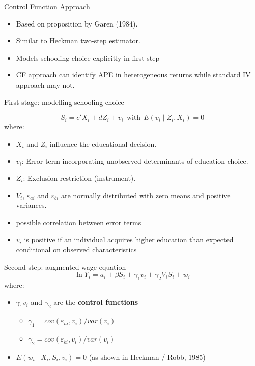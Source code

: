 \documentclass[10pt,ignorenonframetext,]{beamer}
\providecommand{\tightlist}{%
  \setlength{\itemsep}{0pt}\setlength{\parskip}{0pt}}
\begin{document}
\begin{frame}[allowframebreaks]{Control Function Approach}
\protect\hypertarget{control-function-approach}{}

\begin{itemize}
\tightlist
\item
  Based on proposition by Garen (1984).
\item
  Similar to Heckman two-step estimator.
\item
  Models schooling choice explicitly in first step
\item
  CF approach can identify APE in heterogeneous returns while standard
  IV approach may not.
\end{itemize}

First stage: modelling schooling choice

\[S_i = c'X_i + dZ_i + v_i ~~\text{with}~~ E(v_i \mid Z_i, X_i) = 0\]
where:

\begin{itemize}
\item
  \(X_i\) and \(Z_i\) influence the educational decision.
\item
  \(v_i\): Error term incorporating unobserved determinants of education
  choice.
\item
  \(Z_i\): Exclusion restriction (instrument).
\item
  \(V_i\), \(\varepsilon_{ai}\) and \(\varepsilon_{bi}\) are normally
  distributed with zero means and positive variances.
\item
  possible correlation between error terms
\item
  \(v_i\) is positive if an individual acquires higher education than
  expected conditional on observed characteristics
\end{itemize}

Second step: augmented wage equation
\[\ln Y_i = a_i + \beta S_i + \gamma_1 v_i + \gamma_2 V_iS_i + w_i
\] where:

\begin{itemize}
\item
  \(\gamma_1 v_i\) and \(\gamma_2\) are the \textbf{control functions}

  \begin{itemize}
  \item
    \(\gamma_1 = cov(\varepsilon_{ai}, v_i) /var(v_i)\)
  \item
    \(\gamma_2 = cov(\varepsilon_{bi}, v_i) /var(v_i)\)
  \end{itemize}
\item
  \(E(w_i \mid X_i, S_i, v_i) = 0\) (as shown in Heckman / Robb, 1985)
\end{itemize}


\end{frame}
\end{document}
